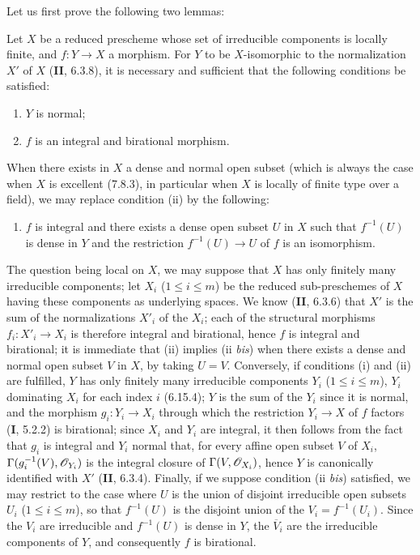 Let us first prove the following two lemmas:

\begin{lemma}[17.15.14.1]
\label{IV.17.15.14.1}
Let $X$ be a reduced prescheme whose set of irreducible components is locally finite, and $f:Y\to X$ a morphism. For $Y$ to be $X$-isomorphic to the normalization $X'$ of $X$ \textup{(\textbf{II}, 6.3.8)}, it is necessary and sufficient that the following conditions be satisfied:
\begin{enumerate}
  \item[\textup{(i)}] $Y$ is normal;
  \item[\textup{(ii)}] $f$ is an integral and birational morphism.
\end{enumerate}
When there exists in $X$ a dense and normal open subset (which is always the case when $X$ is excellent \textup{(7.8.3)}, in particular when $X$ is locally of finite type over a field), we may replace condition \textup{(ii)} by the following:
\begin{enumerate}
  \item[\textup{(ii \emph{bis})}] $f$ is integral and there exists a dense open subset $U$ in $X$ such that $f^{-1}(U)$ is dense in $Y$ and the restriction $f^{-1}(U)\to U$ of $f$ is an isomorphism.
\end{enumerate}
\end{lemma}

The question being local on $X$, we may suppose that $X$ has only finitely many irreducible components; let $X_i$ ($1\leq i\leq m$) be the reduced sub-preschemes of $X$ having these components as underlying spaces. We know (\textbf{II}, 6.3.6) that $X'$ is the sum of the normalizations $X'_i$ of the $X_i$; each of the structural morphisms $f_i:X'_i\to X_i$ is therefore integral and birational, hence $f$ is integral and birational; it is immediate that (ii) implies (ii \emph{bis}) when there exists a dense and normal open subset $V$ in $X$, by taking $U=V$. Conversely, if conditions (i) and (ii) are fulfilled, $Y$ has only finitely many irreducible components $Y_i$ ($1\leq i\leq m$), $Y_i$ dominating $X_i$ for each index $i$ (6.15.4); $Y$ is the sum of the $Y_i$ since it is normal, and the morphism $g_i:Y_i\to X_i$ through which the restriction $Y_i\to X$ of $f$ factors (\textbf{I}, 5.2.2) is birational; since $X_i$ and $Y_i$ are integral, it then follows from the fact that $g_i$ is integral and $Y_i$ normal that, for every affine open subset $V$ of $X_i$, $\Gamma(g_i^{-1}(V),\mathscr{O}_{Y_i})$ is the integral closure of $\Gamma(V,\mathscr{O}_{X_i})$, hence $Y$ is canonically identified with $X'$ (\textbf{II}, 6.3.4). Finally, if we suppose condition (ii \emph{bis}) satisfied, we may restrict to the case where $U$ is the union of disjoint irreducible open subsets $U_i$ ($1\leq i\leq m$), so that $f^{-1}(U)$ is the disjoint union of the $V_i=f^{-1}(U_i)$. Since the $V_i$ are irreducible and $f^{-1}(U)$ is dense in $Y$, the $\overline{V}_i$ are the irreducible components of $Y$, and consequently $f$ is birational.

